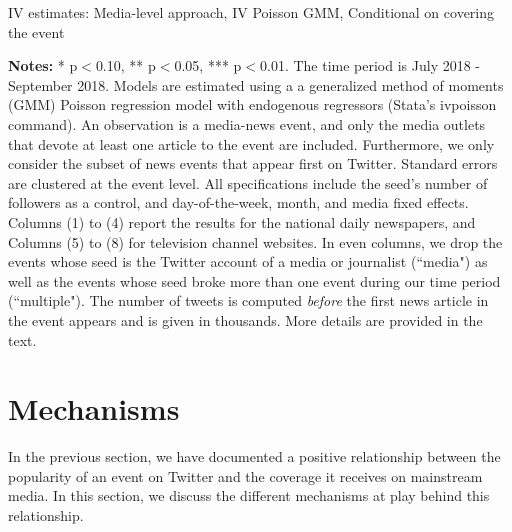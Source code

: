\begin{table}
\caption{IV estimates: Media-level approach, IV Poisson GMM, Conditional on covering the event}
\begin{center}
	
\end{center}
\begin{spacing}{0.5}
	{\fns \textbf{Notes:} * p$<$0.10, ** p$<$0.05, *** p$<$0.01. The time period is July 2018 - September 2018. Models are estimated using a a generalized method of moments (GMM) Poisson regression model with endogenous regressors (Stata's ivpoisson command). An observation is a media-news event, and only the media outlets that devote at least one article to the event are included. Furthermore, we only consider the subset of news events that appear first on Twitter. Standard errors are clustered at the event level. All specifications include the seed's number of followers as a control, and day-of-the-week, month, and media fixed effects. Columns (1) to (4) report the results for the national daily newspapers, and Columns (5) to (8) for television channel websites. In even columns, we drop the events whose seed is the Twitter account of a media or journalist (``media") as well as the events whose seed broke more than one event during our time period (``multiple"). The number of tweets is computed \textit{before} the first news article in the event appears and is given in thousands. More details are provided in the text.}
\end{spacing}
\label{Tab:regression_media_IV_Poisson_GMM_Dcover}
\end{table} 



\section{Mechanisms\label{Sec:Mechanisms}}

In the previous section, we have documented a positive relationship between the popularity of an event on Twitter and the coverage it receives on mainstream media. In this section, we discuss the different mechanisms at play behind this relationship.

